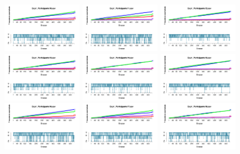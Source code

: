 \documentclass[a4paper ]{article}
\begin{document}
\begin{figure}[th]
\includegraphics[width=0.3\textwidth]{Figures/Outcome_Exp1_P10} \includegraphics[width=0.3\textwidth]{Figures/Outcome_Exp1_P11} \includegraphics[width=0.3\textwidth]{Figures/Outcome_Exp1_P12}
\includegraphics[width=0.3\textwidth]{Figures/Outcome_Exp1_P13} \includegraphics[width=0.3\textwidth]{Figures/Outcome_Exp1_P14} \includegraphics[width=0.3\textwidth]{Figures/Outcome_Exp1_P15}
\includegraphics[width=0.3\textwidth]{Figures/Outcome_Exp1_P16} \includegraphics[width=0.3\textwidth]{Figures/Outcome_Exp1_P17} \includegraphics[width=0.3\textwidth]{Figures/Outcome_Exp1_P18}

\end{figure}
\end{document}
